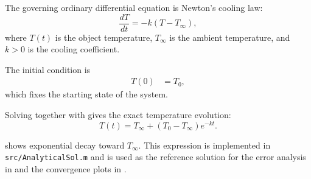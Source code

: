 The governing ordinary differential equation is Newton's cooling law:
\begin{equation}
\frac{dT}{dt} = -k\left(T - T_{\infty}\right),
\label{eq:newton-ode}
\end{equation}
where $T(t)$ is the object temperature, $T_{\infty}$ is the ambient temperature, and
$k>0$ is the cooling coefficient.

The initial condition is
\begin{subequations}\label{eq:initial-condition-set}
\begin{align}
T(0) &= T_0, \label{eq:initial-condition}
\end{align}
\end{subequations}
which fixes the starting state of the system.

Solving  together with  gives
the exact temperature evolution:
\begin{equation}
T(t) = T_{\infty} + \left(T_0 - T_{\infty}\right)e^{-kt}.
\label{eq:exact-solution}
\end{equation}

 shows exponential decay toward
$T_{\infty}$. This expression is implemented in
\texttt{src/AnalyticalSol.m} and is used as the reference solution for the
error analysis in  and the convergence plots in
.
